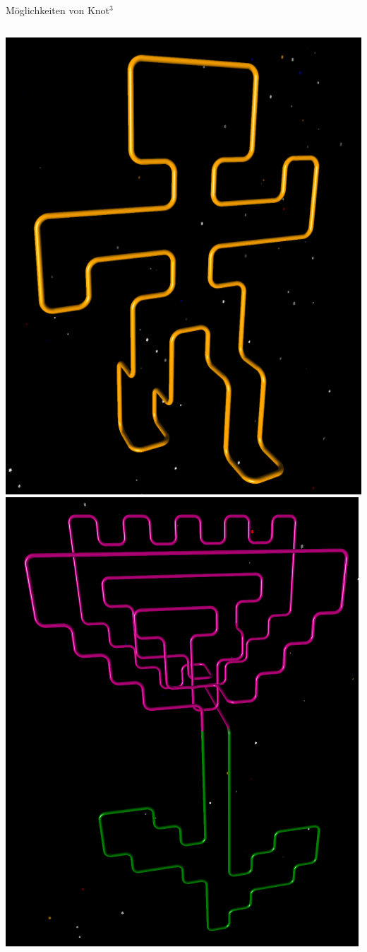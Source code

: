 \documentclass[18pt]{beamer}
\begin{document}
\begin{frame}{Möglichkeiten von Knot$^3$}

\begin{columns}[c]
 \includegraphics[scale=0.35]{mann}
 \includegraphics[scale=0.38]{blume}

\end{columns}
\end{frame}
\end{document}
